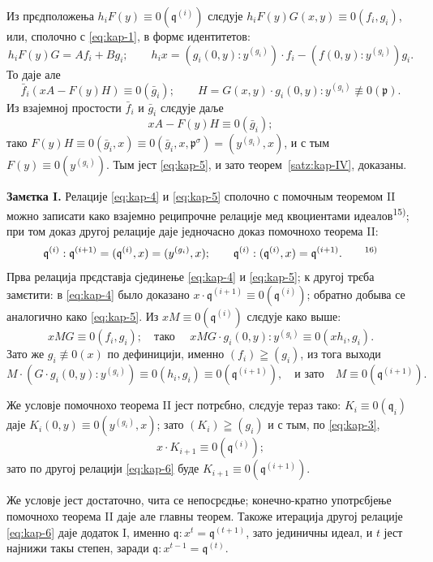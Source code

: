 \documentclass[11pt]{article}
\theoremstyle{plain}
\begin{document}
Из прєдположења $h_{i}F(y) \equiv 0(\mathfrak{q}^{(i)})$
слєдује
$h_{i}F(y)G(x,y) \equiv 0(f_{i}, g_{i})$, или, сполочно
с \eqref{eq:kap-1}, в формє идентитетов:
\[
h_{i}F(y)G = Af_{i} + Bg_{i}; \qquad
h_{i}x = (g_{i}(0,y):y^{(g_{i})})\cdot f_{i}
- (f(0,y):y^{(g_{i})})g_{i}.
\]
То даје але
\[
\bar{f}_{i}(xA - F(y)H) \equiv 0(\bar{g}_{i}); \qquad
H = G(x,y) \cdot g_{i}(0,y) : y^{(g_{i})} \not\equiv 0(\mathfrak{p}).
\]
Из взајемној простости $\bar{f}_{i}$ и $\bar{g}_{i}$ слєдује даље
\[
xA - F(y)H \equiv 0(\bar{g}_{i});
\]
тако $F(y)H \equiv 0(\bar{g}_{i}, x)
\equiv 0(\bar{g}_{i}, x, \mathfrak{p}^{\sigma})
= (y^{(g_{i})}, x)$, и с тым $F(y) \equiv 0(y^{(g_{i})})$.
Тым јест \eqref{eq:kap-5}, и зато теорем~\ref{satz:kap-IV}, доказаны.

\smallskip
\textbf{Замєтка I.} Релације \eqref{eq:kap-4} и \eqref{eq:kap-5}
сполочно с помочным теоремом II можно записати како взајемно
реципрочне релације мед квоциентами идеалов\textsuperscript{15)};
при том доказ другој релације даје једночасно доказ помочнохо
теорема II:
\begin{equation}\label{eq:kap-6}
\mathfrak{q}^{(i)} : \mathfrak{q}^{(i+1)}
= (\mathfrak{q}^{(i)}, x) = (y^{(g_{i})}, x); \qquad
\mathfrak{q}^{(i)} : (\mathfrak{q}^{(i)}, x)
= \mathfrak{q}^{(i+1)}.\qquad\text{\textsuperscript{16)}}
\end{equation}
Прва релација прєдставја сјединење \eqref{eq:kap-4} и
\eqref{eq:kap-5}; к другој трєба замєтити: в \eqref{eq:kap-4}
было доказано
$x \cdot \mathfrak{q}^{(i+1)} \equiv 0(\mathfrak{q}^{(i)})$;
обратно добыва се аналогично како \eqref{eq:kap-5}. Из
$xM \equiv 0(\mathfrak{q}^{(i)})$ слєдује како выше:
\[
xMG \equiv 0(f_{i}, g_{i}); \quad \text{тако }\quad
xMG \cdot g_{i}(0,y) : y^{(g_{i})}
\equiv 0(xh_{i}, g_{i}).
\]
Зато же $g_{i} \not\equiv 0(x)$ по дефиницији, именно
$(f_i)\geqq(g_i)$, из тога выходи
\[
M \cdot (G \cdot g_{i}(0,y) : y^{(g_{i})})
\equiv 0(h_{i}, g_{i}) \equiv 0(\mathfrak{q}^{(i+1)}),
\quad\text{и зато}\quad M \equiv 0(\mathfrak{q}^{(i+1)}).
\]

Же условје помочнохо теорема II јест потрєбно, слєдује тераз тако:
$K_i\equiv0(\mathfrak{q}_i)$ даје
$K_{i}(0,y) \equiv 0(y^{(g_{i})}, x)$; зато
$(K_i)\geqq(g_i)$ и с тым, по \eqref{eq:kap-3},
\[
x \cdot K_{i+1} \equiv 0(\mathfrak{q}^{(i)});
\]
зато по другој релацији \eqref{eq:kap-6} буде
$K_{i+1} \equiv 0(\mathfrak{q}^{(i+1)})$.

Же условје јест достаточно, чита се непосрєдње; конечно-кратно
употрєбјење помочнохо теорема II даје але главны теорем. Такоже
итерација другој релације \eqref{eq:kap-6} даје додаток I, именно
$\mathfrak{q} : x^{t} = \mathfrak{q}^{(t+1)}$, зато јединичны
идеал, и $t$ јест најнижи такы степен, заради
$\mathfrak{q} : x^{t-1} = \mathfrak{q}^{(t)}$.
\end{document}
